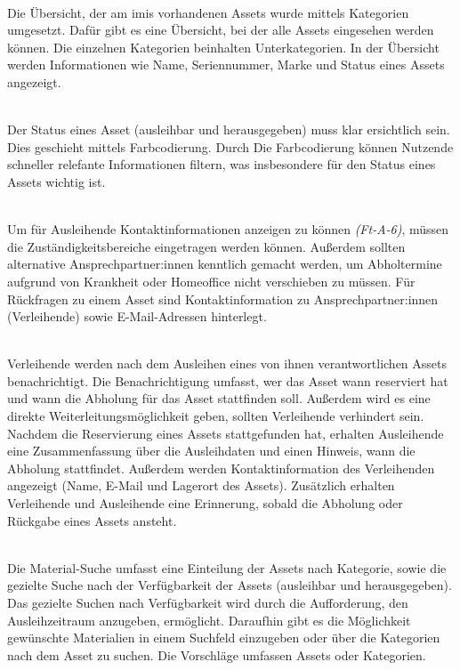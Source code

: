     {\sffamily\color{maincolor}{Ft-VA-2 | Übersicht über ausleihbare Assets }}\\
Die Übersicht, der am \ac{imis} vorhandenen Assets wurde mittels Kategorien
umgesetzt. Dafür gibt es eine Übersicht, bei der alle Assets eingesehen werden
können. Die einzelnen Kategorien beinhalten Unterkategorien. In der Übersicht
werden Informationen wie Name, Seriennummer, Marke und Status eines Assets
angezeigt.

    {\sffamily\color{maincolor}{Ft-VA-3 |  Verfügbarkeit von Assets }}\\
Der Status eines Asset (ausleihbar und herausgegeben) muss klar ersichtlich sein. Dies geschieht
mittels Farbcodierung. Durch Die Farbcodierung können Nutzende schneller relefante Informationen
filtern, was insbesondere für den Status eines Assets wichtig ist.


{\sffamily\color{maincolor}{Ft-VA-4 | Zuständigkeitsbereich }}\\
Um für Ausleihende Kontaktinformationen anzeigen zu können \textit{(Ft-A-6)},
müssen die Zuständigkeitsbereiche eingetragen werden können. Außerdem sollten
alternative Ansprechpartner:innen kenntlich gemacht werden, um Abholtermine
aufgrund von Krankheit oder Homeoffice nicht verschieben zu müssen. Für
Rückfragen zu einem Asset sind Kontaktinformation zu Ansprechpartner:innen
(Verleihende) sowie E-Mail-Adressen hinterlegt.

    {\sffamily\color{maincolor}{Ft-VA-5 | Benachrichtigungen \& Erinnerungen
        }}\\
Verleihende werden nach dem Ausleihen eines von ihnen verantwortlichen Assets benachrichtigt. Die
Benachrichtigung umfasst, wer das Asset wann reserviert hat und wann die Abholung für das Asset
stattfinden soll. Außerdem wird es eine direkte Weiterleitungsmöglichkeit geben, sollten Verleihende
verhindert sein. Nachdem die Reservierung eines Assets stattgefunden hat, erhalten Ausleihende eine
Zusammenfassung über die Ausleihdaten und einen Hinweis, wann die Abholung stattfindet. Außerdem
werden Kontaktinformation des Verleihenden angezeigt (Name, E-Mail und Lagerort des Assets).
Zusätzlich erhalten Verleihende und Ausleihende eine Erinnerung, sobald die Abholung oder Rückgabe
eines Assets ansteht.

    {\sffamily\color{maincolor}{Ft-VA-6 | Material-Suche }}\\
Die Material-Suche umfasst eine Einteilung der Assets nach Kategorie, sowie die gezielte Suche nach
der Verfügbarkeit der Assets (ausleihbar und herausgegeben). Das gezielte Suchen nach Verfügbarkeit
wird durch die Aufforderung, den Ausleihzeitraum anzugeben, ermöglicht. Daraufhin gibt es die
Möglichkeit gewünschte Materialien in einem Suchfeld einzugeben oder über die Kategorien nach dem
Asset zu suchen. Die Vorschläge umfassen Assets oder Kategorien.

